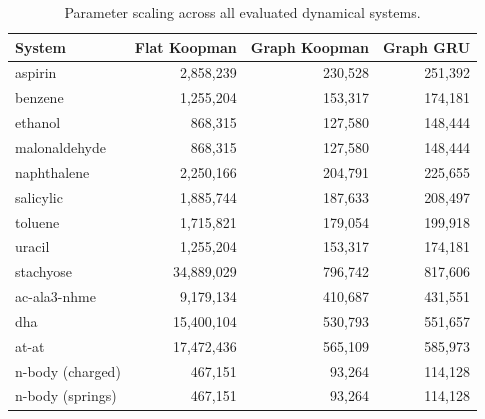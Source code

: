 \documentclass{article}
\begin{document}
\begin{table}[h]
\centering
\begin{tabular}{lrrr}
\toprule
\textbf{System} & \textbf{Flat Koopman} & \textbf{Graph Koopman} & \textbf{Graph GRU} \\
\midrule
aspirin & 2,858,239 & 230,528 & 251,392 \\
benzene & 1,255,204 & 153,317 & 174,181 \\
ethanol & 868,315 & 127,580 & 148,444 \\
malonaldehyde & 868,315 & 127,580 & 148,444 \\
naphthalene & 2,250,166 & 204,791 & 225,655 \\
salicylic & 1,885,744 & 187,633 & 208,497 \\
toluene & 1,715,821 & 179,054 & 199,918 \\
uracil & 1,255,204 & 153,317 & 174,181 \\
stachyose & 34,889,029 & 796,742 & 817,606 \\
ac-ala3-nhme & 9,179,134 & 410,687 & 431,551 \\
dha & 15,400,104 & 530,793 & 551,657 \\
at-at & 17,472,436 & 565,109 & 585,973 \\
n-body (charged) & 467,151 & 93,264 & 114,128 \\
n-body (springs) & 467,151 & 93,264 & 114,128 \\
\bottomrule
\end{tabular}
\caption{Parameter scaling across all evaluated dynamical systems.}
\label{tab:app_params}
\end{table}
\end{document}
